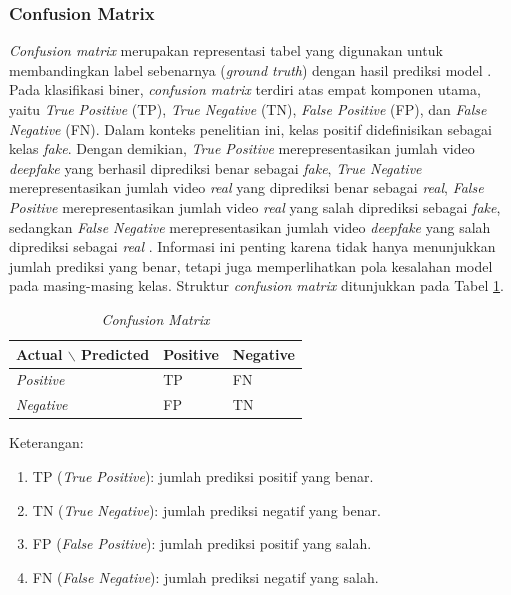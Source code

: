 \subsubsection{Confusion Matrix} \label{II.Teori7.1}
\textit{Confusion matrix} merupakan representasi tabel yang digunakan untuk membandingkan label sebenarnya (\textit{ground truth}) dengan hasil prediksi model \cite{SOKOLOVA2009427}. Pada klasifikasi biner, \textit{confusion matrix} terdiri atas empat komponen utama, yaitu \textit{True Positive} (TP), \textit{True Negative} (TN), \textit{False Positive} (FP), dan \textit{False Negative} (FN). Dalam konteks penelitian ini, kelas positif didefinisikan sebagai kelas \textit{fake}. Dengan demikian, \textit{True Positive} merepresentasikan jumlah video \textit{deepfake} yang berhasil diprediksi benar sebagai \textit{fake}, \textit{True Negative} merepresentasikan jumlah video \textit{real} yang diprediksi benar sebagai \textit{real}, \textit{False Positive} merepresentasikan jumlah video \textit{real} yang salah diprediksi sebagai \textit{fake}, sedangkan \textit{False Negative} merepresentasikan jumlah video \textit{deepfake} yang salah diprediksi sebagai \textit{real} \cite{SOKOLOVA2009427}\cite{powers2020evaluationprecisionrecallfmeasure}. Informasi ini penting karena tidak hanya menunjukkan jumlah prediksi yang benar, tetapi juga memperlihatkan pola kesalahan model pada masing-masing kelas. Struktur \textit{confusion matrix} ditunjukkan pada Tabel \ref{tab:confusion-matrix}. \par

\begin{table}[htbp]
	\centering
	\caption{\textit{Confusion Matrix}}
	\label{tab:confusion-matrix}
	\begin{tabular}{|>{\centering\arraybackslash}p{}|>{\centering\arraybackslash}p{}|>{\centering\arraybackslash}p{}|}
		\hline
		\textbf{Actual} $\backslash$ \textbf{Predicted} & \textbf{Positive} & \textbf{Negative} \\
		\hline
		\textit{Positive} & TP & FN \\
		\hline
		\textit{Negative} & FP & TN \\
		\hline
	\end{tabular}
\end{table}

Keterangan:
\begin{enumerate}[label=\alph*., noitemsep]
	\item TP (\textit{True Positive}): jumlah prediksi positif yang benar.
	\item TN (\textit{True Negative}): jumlah prediksi negatif yang benar.
	\item FP (\textit{False Positive}): jumlah prediksi positif yang salah.
	\item FN (\textit{False Negative}): jumlah prediksi negatif yang salah.
\end{enumerate}
\par

